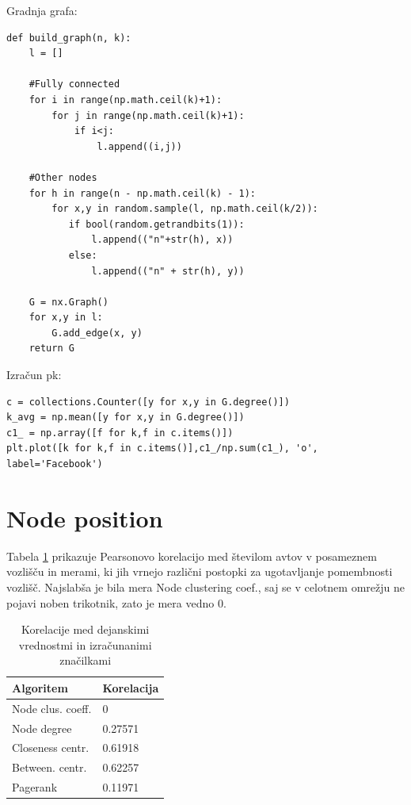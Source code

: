 \documentclass[a4paper,11pt]{article}
\begin{document}
\begin{minipage}{\linewidth}

Gradnja grafa:

\begin{lstlisting}
def build_graph(n, k):
    l = []
    
    #Fully connected
    for i in range(np.math.ceil(k)+1):
        for j in range(np.math.ceil(k)+1):
            if i<j:
                l.append((i,j))
                
    #Other nodes       
    for h in range(n - np.math.ceil(k) - 1):
        for x,y in random.sample(l, np.math.ceil(k/2)):
           if bool(random.getrandbits(1)):
               l.append(("n"+str(h), x))
           else:
               l.append(("n" + str(h), y))

    G = nx.Graph()
    for x,y in l:
        G.add_edge(x, y)
    return G
\end{lstlisting}
\end{minipage}


\begin{minipage}{\linewidth}
Izračun pk:

\begin{lstlisting}
c = collections.Counter([y for x,y in G.degree()])
k_avg = np.mean([y for x,y in G.degree()])
c1_ = np.array([f for k,f in c.items()])
plt.plot([k for k,f in c.items()],c1_/np.sum(c1_), 'o', label='Facebook')
\end{lstlisting}
\end{minipage}

\section{Node position}

Tabela \ref{cor_t} prikazuje Pearsonovo korelacijo med številom avtov v posameznem vozlišču in merami, ki jih vrnejo različni postopki za ugotavljanje pomembnosti vozlišč. Najslabša je bila mera Node clustering coef., saj se v celotnem omrežju ne pojavi noben trikotnik, zato je mera vedno 0. 

\begin{table}[]
\centering
\caption{Korelacije med dejanskimi vrednostmi in izračunanimi značilkami}
\label{cor_t}
\begin{tabular}{|l|l|}
\hline
Algoritem & Korelacija   \\ \hline
Node clus.
coeff. & 0   \\ \hline
Node degree & 0.27571  \\ \hline
Closeness centr.  &  0.61918  \\ \hline
Between. centr.  & 0.62257  \\ \hline
Pagerank  &  0.11971 \\ \hline
\end{tabular}
\end{table} 
\end{document}

